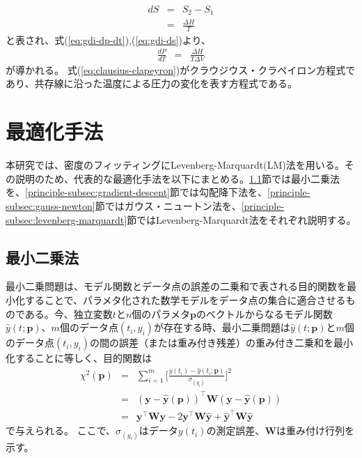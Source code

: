 \documentclass[titlepage]{jsreport}
\begin{document}
\large
\begin{eqnarray}
dS &=& S_2-S_1 \nonumber \\
   &=& \frac{\Delta{H}}{T} \label{eq:gdi-ds}
\end{eqnarray}
\normalsize
と表され、式(\ref{eq:gdi-dp-dt}),(\ref{eq:gdi-ds})より、
\large
\begin{eqnarray}
\frac{dP}{dT} &=& \frac{\Delta{H}}{T\Delta{V}} \label{eq:clausius-clapeyron}
\end{eqnarray}
\normalsize
が導かれる。
式(\ref{eq:clausius-clapeyron})がクラウジウス・クラペイロン方程式であり、共存線に沿った温度による圧力の変化を表す方程式である\cite{atkins, clausius-clapeyron1}。


\section{最適化手法}\label{principle-sec:optimization-method}
本研究では、密度のフィッティングにLevenberg-Marquardt(LM)法を用いる。その説明のため、代表的な最適化手法を以下にまとめる。\ref{principle-subsec:least-squares}節では最小二乗法を、\ref{principle-subsec:gradient-descent}節では勾配降下法を、\ref{principle-subsec:gauss-newton}節ではガウス・ニュートン法を、\ref{principle-subsec:levenberg-marquardt}節ではLevenberg-Marquardt法をそれぞれ説明する。

\subsection{最小二乗法}\label{principle-subsec:least-squares}
最小二乗問題は、モデル関数とデータ点の誤差の二乗和で表される目的関数を最小化することで、パラメタ化された数学モデルをデータ点の集合に適合させるものである。今、独立変数$t$と$n$個のパラメタ$\bm{p}$のベクトルからなるモデル関数$\hat{y}(t;\bm{p})$、$m$個のデータ点$(t_i, y_i)$が存在する時、最小二乗問題は$\hat{y}(t;\bm{p})$と$m$個のデータ点$(t_i, y_i)$の間の誤差（または重み付き残差）の重み付き二乗和を最小化することに等しく、目的関数は
\large
\begin{eqnarray}
\chi^2(\bm{p}) &=& \sum_{i=1}^{m}\Bigg[\frac{y(t_i)-\hat{y}(t_i;\bm{p})}{\sigma_(y_i)}\Bigg]^2 \nonumber\\
               &=& (\bm{y}-\hat{\bm{y}}(\bm{p}))^\top\bm{W}(\bm{y}-\hat{\bm{y}}(\bm{p})) \nonumber\\
               &=& \bm{y}^\top\bm{W}\bm{y}-2\bm{y}^\top\bm{W}\hat{\bm{y}}+\hat{\bm{y}}^\top\bm{W}\hat{\bm{y}} \label{eq:queue-residual-error}
\end{eqnarray}
\normalsize
で与えられる。
ここで、$\sigma_(y_i)$はデータ$y(t_i)$の測定誤差、$\bm{W}$は重み付け行列を示す\cite{gradient-descent_gauss-newton_levenberg-marquardt}。
\end{document}
